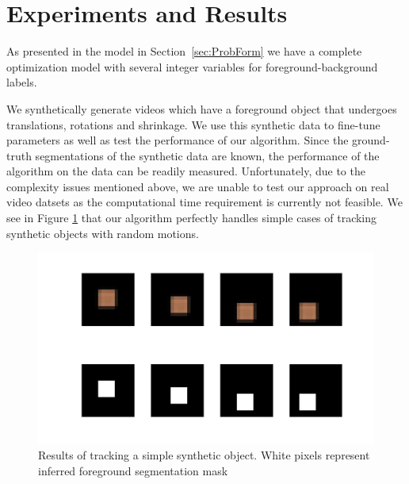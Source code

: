 \section{Experiments and Results}
\label{sec:Expt}
As presented in the model in Section~\ref{sec:ProbForm} we have a complete optimization
model with several integer variables for foreground-background labels.

%
%


We synthetically generate videos which have a foreground object that undergoes translations, rotations and shrinkage. We use this synthetic data to fine-tune parameters as well as test the performance of our algorithm. Since the ground-truth segmentations of the synthetic data are known, the performance of the algorithm on the data can be readily measured. Unfortunately, due to the complexity issues mentioned above, we are unable to test our approach on real video datsets as the computational time requirement is currently not feasible. We see in Figure \ref{fig:trackSquare} that our algorithm perfectly handles simple cases of tracking synthetic objects with random motions.

\begin{figure}[h]
\begin{center}
	\includegraphics[scale=0.35]{figures/easy_square_tracking.jpg}
	\caption{Results of tracking a simple synthetic object. White pixels represent inferred foreground segmentation mask}
	\label{fig:trackSquare}
\end{center}
\end{figure}

